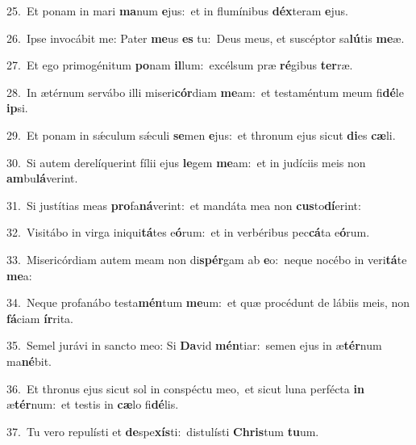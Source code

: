 {\numbfont\textcolor{\numbcolor}{25.}}~Et ponam in mari \textbf{ma}\-num \textbf{e}\-jus:~\star et in flumínibus \textbf{déx}\-teram \textbf{e}\-jus.\par
{\numbfont\textcolor{\numbcolor}{26.}}~Ipse invocábit me: Pater \textbf{me}\-us \textbf{es} tu:~\star Deus meus, et suscéptor sa\-\textbf{lú}\-tis \textbf{me}\-æ.\par
{\numbfont\textcolor{\numbcolor}{27.}}~Et ego primogénitum \textbf{po}\-nam \textbf{il}\-lum:~\star excélsum præ \textbf{ré}\-gibus \textbf{ter}\-ræ.\par
{\numbfont\textcolor{\numbcolor}{28.}}~In ætérnum servábo illi miseri\-\textbf{cór}\-diam \textbf{me}\-am:~\star et testaméntum meum fi\-\textbf{dé}\-le \textbf{ip}\-si.\par
{\numbfont\textcolor{\numbcolor}{29.}}~Et ponam in sǽculum sǽculi \textbf{se}\-men \textbf{e}\-jus:~\star et thronum ejus sicut \textbf{di}\-es \textbf{cæ}\-li.\par
{\numbfont\textcolor{\numbcolor}{30.}}~Si autem derelíquerint fílii ejus \textbf{le}\-gem \textbf{me}\-am:~\star et in judíciis meis non \textbf{am}\-bu\-\textbf{lá}\-verint.\par
{\numbfont\textcolor{\numbcolor}{31.}}~Si justítias meas \textbf{pro}\-fa\-\textbf{ná}\-verint:~\star et mandáta mea non \textbf{cus}\-to\-\textbf{dí}\-erint:\par
{\numbfont\textcolor{\numbcolor}{32.}}~Visitábo in virga iniqui\-\textbf{tá}\-tes e\-\textbf{ó}\-rum:~\star et in verbéribus pec\-\textbf{cá}\-ta e\-\textbf{ó}\-rum.\par
{\numbfont\textcolor{\numbcolor}{33.}}~Misericórdiam autem meam non di\-\textbf{spér}\-gam ab \textbf{e}\-o:~\star neque nocébo in veri\-\textbf{tá}\-te \textbf{me}\-a:\par
{\numbfont\textcolor{\numbcolor}{34.}}~Neque profanábo testa\-\textbf{mén}\-tum \textbf{me}\-um:~\star et quæ procédunt de lábiis meis, non \textbf{fá}\-ciam \textbf{ír}\-rita.\par
{\numbfont\textcolor{\numbcolor}{35.}}~Semel jurávi in sancto meo: Si \textbf{Da}\-vid \textbf{mén}\-tiar:~\star semen ejus in æ\-\textbf{tér}\-num ma\-\textbf{né}\-bit.\par
{\numbfont\textcolor{\numbcolor}{36.}}~Et thronus ejus sicut sol in conspéctu meo,~\dagger et sicut luna perfécta \textbf{in} æ\-\textbf{tér}\-num:~\star et testis in \textbf{cæ}\-lo fi\-\textbf{dé}\-lis.\par
{\numbfont\textcolor{\numbcolor}{37.}}~Tu vero repulísti et \textbf{de}\-spe\-\textbf{xís}\-ti:~\star distulísti \textbf{Chris}\-tum \textbf{tu}\-um.\par
